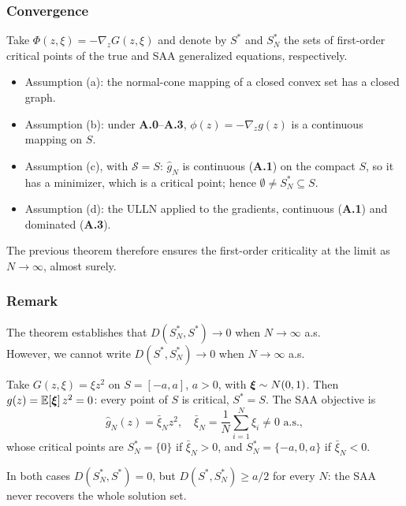 \documentclass[aspectratio=169]{beamer}
\begin{document}
\begin{frame}
\frametitle{Convergence}

Take $\Phi(z,\xi) = -\nabla_z G(z, \xi)$ and denote by $S^*$ and $S^*_N$ the sets of first-order critical points of the true and SAA generalized equations, respectively.

\begin{itemize}
\item
Assumption (a): the normal-cone mapping of a closed convex set has a closed graph.
\item
Assumption (b): under \textbf{A.0}--\textbf{A.3}, $\phi(z) = -\nabla_z
g(z)$ is a continuous mapping on $S$.
\item
Assumption (c), with $\mathcal{S} = S$: $\hat{g}_N$ is continuous (\textbf{A.1}) on the compact $S$, so it has a minimizer, which is a critical point; hence $\emptyset \neq S_N^* \subseteq S$.
\item
Assumption (d): the ULLN applied to the gradients, continuous (\textbf{A.1}) and dominated (\textbf{A.3}).
\end{itemize}

The previous theorem therefore ensures the first-order criticality at the limit as $N\rightarrow\infty$, almost surely.

\end{frame}

\begin{frame}
\frametitle{Remark}

The theorem establishes that $D(S_N^*, S^*) \rightarrow 0$ when $N \rightarrow \infty$ a.s.\\
However, we cannot write $D(S^*, S_N^*) \rightarrow 0$ when $N \rightarrow \infty$ a.s.

\mbox{}

Take $G(z, \xi) = \xi z^2$ on $S = [-a,a]$, $a > 0$, with ${\boldsymbol{\xi}} \sim N(0, 1)$.
Then $g(z) = {\mathbb{E}}[{\boldsymbol{\xi}}]\, z^2 = 0$: every point of $S$ is critical, $S^* = S$.
The SAA objective is
$$
\hat{g}_N(z) = \bar{\xi}_N z^2, \quad \bar{\xi}_N = \frac{1}{N} \sum_{i = 1}^N \xi_i \neq 0 \text{ a.s.},
$$
whose critical points are $S^*_N = \{ 0 \}$ if $\bar{\xi}_N > 0$, and $S^*_N = \{ -a, 0, a \}$ if $\bar{\xi}_N < 0$.

\mbox{}

In both cases $D(S^*_N, S^*) = 0$, but $D(S^*, S^*_N) \geq a/2$ for every $N$: the SAA never recovers the whole solution set.

\end{frame}
\end{document}
